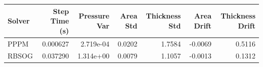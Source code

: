 \begin{tabular}{lrrrrrr}
\toprule
Solver & Step Time (s) & Pressure Var & Area Std & Thickness Std & Area Drift & Thickness Drift \\
\midrule
PPPM & 0.000627 & 2.719e-04 & 0.0202 & 1.7584 & -0.0069 & 0.5116 \\
RBSOG & 0.037290 & 1.314e+00 & 0.0079 & 1.1057 & -0.0013 & 0.1312 \\
\bottomrule
\end{tabular}
